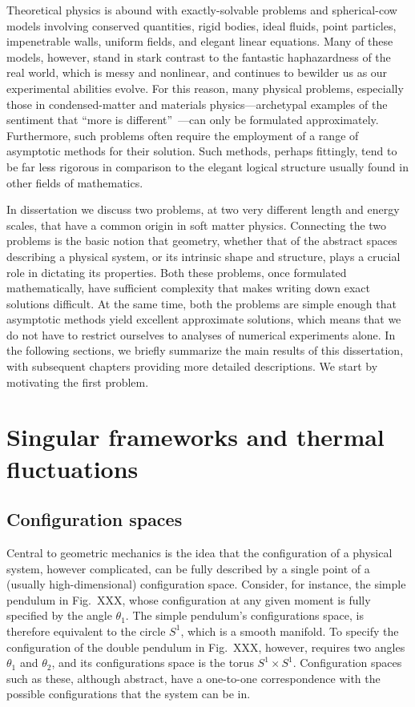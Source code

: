 Theoretical physics is abound with exactly-solvable problems and spherical-cow models involving conserved quantities, rigid bodies, ideal fluids, point particles, impenetrable walls, uniform fields, and elegant linear equations.
Many of these models, however, stand in stark contrast to the fantastic haphazardness of the real world, which is messy and nonlinear, and continues to bewilder us as our experimental abilities evolve.
For this reason, many physical problems, especially those in condensed-matter and materials physics---archetypal examples of the sentiment that ``more is different''~\cite{anderson1972}---can only be formulated approximately.
Furthermore, such problems often require the employment of a range of asymptotic methods for their solution.
Such methods, perhaps fittingly, tend to be far less rigorous in comparison to the elegant logical structure usually found in other fields of mathematics.

In dissertation we discuss two problems, at two very different length and energy scales, that have a common origin in soft matter physics.
Connecting the two problems is the basic notion that geometry, whether that of the abstract spaces describing a physical system, or its intrinsic shape and structure, plays a crucial role in dictating its properties.
Both these problems, once formulated mathematically, have sufficient complexity that makes writing down exact solutions difficult.
At the same time, both the problems are simple enough that asymptotic methods yield excellent approximate solutions, which means that we do not have to restrict ourselves to analyses of numerical experiments alone.
In the following sections, we briefly summarize the main results of this dissertation, with subsequent chapters providing more detailed descriptions.
We start by motivating the first problem.

\section{Singular frameworks and thermal fluctuations}

\subsection{Configuration spaces}

Central to geometric mechanics is the idea that the configuration of a physical system, however complicated, can be fully described by a single point of a (usually high-dimensional) configuration space.
Consider, for instance, the simple pendulum in Fig.~XXX, whose configuration at any given moment is fully specified by the angle $\theta_{1}$.
The simple pendulum's configurations space, is therefore equivalent to the circle $S^{1}$, which is a smooth manifold.
To specify the configuration of the double pendulum in Fig.~XXX, however, requires two angles $\theta_{1}$ and $\theta_{2}$, and its configurations space is the torus $S^{1}\times S^{1}$.
Configuration spaces such as these, although abstract, have a one-to-one correspondence with the possible configurations that the system can be in.

